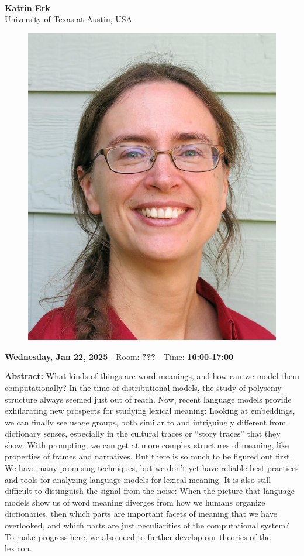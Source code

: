 \leavevmode\newline \leavevmode\newline
{\centering
{}\\  \vspace*{-0.1cm} \leavevmode\newline
{\normalsize \textbf{Katrin Erk}}\\
{\normalsize {University of Texas at Austin, USA}}\\


\begin{figure}[h!]
  \centering
      \includegraphics[width=0.15\linewidth]{invited_talks/katrin_erk_invited_2.png}
\end{figure}

 {\normalsize \textbf{Wednesday, Jan 22, 2025} -
 Room: \textbf{???} -
 Time: \textbf{16:00-17:00}\\\leavevmode\newline
 }
}

{\textbf{Abstract:}}
What kinds of things are word meanings, and how can we model them computationally? In the time of distributional models, the study of polysemy structure always seemed just out of reach. Now, recent language models provide exhilarating new prospects for studying lexical meaning: Looking at embeddings, we can finally see usage groups, both similar to and intriguingly different from dictionary senses, especially in the cultural traces or “story traces” that they show. With prompting, we can get at more complex structures of meaning, like properties of frames and narratives. But there is so much to be figured out first. We have many promising techniques, but we don’t yet have reliable best practices and tools for analyzing language models for lexical meaning. It is also still difficult to distinguish the signal from the noise: When the picture that language models show us of word meaning diverges from how we humans organize dictionaries, then which parts are important facets of meaning that we have overlooked, and which parts are just peculiarities of the computational system? To make progress here, we also need to further develop our theories of the lexicon.\\


